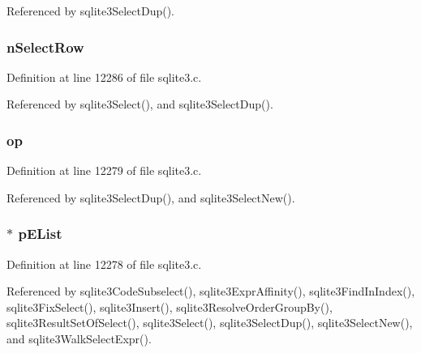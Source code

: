 Referenced by sqlite3\+Select\+Dup().

\hypertarget{struct_select_a6ffd32b047af2ae043f5ac02c5507cca}{}
\subsubsection[{n\+Select\+Row}]{ n\+Select\+Row}\label{struct_select_a6ffd32b047af2ae043f5ac02c5507cca}


Definition at line 12286 of file sqlite3.\+c.



Referenced by sqlite3\+Select(), and sqlite3\+Select\+Dup().

\hypertarget{struct_select_a0991b29aa40e12f033237266ebe6610c}{}
\subsubsection[{op}]{ op}\label{struct_select_a0991b29aa40e12f033237266ebe6610c}


Definition at line 12279 of file sqlite3.\+c.



Referenced by sqlite3\+Select\+Dup(), and sqlite3\+Select\+New().

\hypertarget{struct_select_a08025e7aa4f4c6b65204b463580746ef}{}
\subsubsection[{p\+E\+List}]{$\ast$ p\+E\+List}\label{struct_select_a08025e7aa4f4c6b65204b463580746ef}


Definition at line 12278 of file sqlite3.\+c.



Referenced by sqlite3\+Code\+Subselect(), sqlite3\+Expr\+Affinity(), sqlite3\+Find\+In\+Index(), sqlite3\+Fix\+Select(), sqlite3\+Insert(), sqlite3\+Resolve\+Order\+Group\+By(), sqlite3\+Result\+Set\+Of\+Select(), sqlite3\+Select(), sqlite3\+Select\+Dup(), sqlite3\+Select\+New(), and sqlite3\+Walk\+Select\+Expr().

\hypertarget{struct_select_ab73f489b26450bf7c199d78c93092cea}{}
